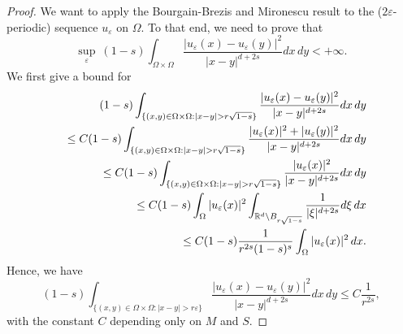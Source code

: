 \documentclass{article}
\newcommand{\e}{\varepsilon}
\begin{document}
\begin{proof} We want to apply the Bourgain-Brezis and Mironescu result to the ($2\e$-periodic) 
sequence $u_\e$ on $\Omega$. To that end, we need to prove that
\begin{equation}\label{otto}
\sup_\e\ (1-s)\int_{\Omega\times\Omega} \frac{|u_\e(x)-u_\e(y)|^2}{|x-y|^{d+2s}} dx\,dy<+\infty.
\end{equation}
 We first give a bound for 
\begin{eqnarray*}
&&\hskip-1cm(1-s)\int_{\{(x,y)\in \Omega\times\Omega:|x-y|>r\sqrt{1-s}\}} \frac{|u_\e(x)-u_\e(y)|^2}{|x-y|^{d+2s}} dx\,dy
\\&&\le C
(1-s)\int_{\{(x,y)\in \Omega\times\Omega:|x-y|>r\sqrt{1-s}\}} \frac{|u_\e(x)|^2+|u_\e(y)|^2}{|x-y|^{d+2s}} dx\,dy
\\&&\le C
(1-s)\int_{\{(x,y)\in \Omega\times\Omega:|x-y|>r\sqrt{1-s}\}} \frac{|u_\e(x)|^2}{|x-y|^{d+2s}} dx\,dy
\\&&\le C
(1-s)\int_{\Omega} |u_\e(x)|^2\int_{\mathbb R^d\setminus B_{r\sqrt{1-s}}}\frac1{|\xi|^{d+2s}} d\xi\,dx
\\&&\le C
(1-s)\frac1{r^{2s}(1-s)^s}\int_{\Omega} |u_\e(x)|^2\,dx.
\end{eqnarray*}
Hence, we have 
\begin{equation}\label{13}
(1-s)\int_{\{(x,y)\in \Omega\times\Omega:|x-y|>r\e\}} \frac{|u_\e(x)-u_\e(y)|^2}{|x-y|^{d+2s}} dx\,dy\le C\frac1{r^{2s}},
\end{equation}
with the constant $C$ depending only on  $M$ and $S$.


\end{proof}
\end{document}
